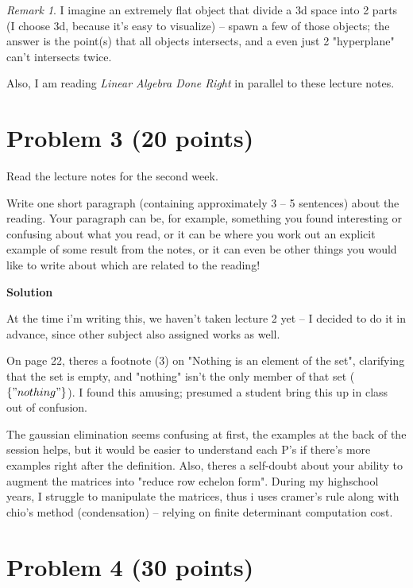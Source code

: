 \documentclass{article}
\newcommand{\solution}{\textbf{\large Solution}}
\theoremstyle{remark}
\newtheorem*{remark}{Remark}
\begin{document}
\begin{remark}
I imagine an extremely flat object that divide a 3d space into 2 parts (I choose 3d, because it's easy to visualize) -- spawn a few of those objects; the answer is the point(s) that all objects intersects, and a even just 2 "hyperplane" can't intersects twice. 
\end{remark}

Also, I am reading \emph{Linear Algebra Done Right} in parallel to these lecture notes.
\newpage

\section*{Problem 3 (20 points)}

Read the lecture notes for the second week.

Write one short paragraph (containing approximately 3 -- 5 sentences) about the reading. Your
paragraph can be, for example, something you found interesting or confusing about what you read,
or it can be where you work out an explicit example of some result from the notes, or it can even
be other things you would like to write about which are related to the reading!

\medskip
\solution


At the time i'm writing this, we haven't taken lecture 2 yet -- I decided to do it in advance, since other subject also assigned works as well. 

On page 22, theres a footnote (3) on "Nothing is an element of the set", clarifying that the set is empty, and "nothing" isn't the only member of that set ($\{"nothing"\}$). I found this amusing; presumed a student bring this up in class out of confusion. 

The gaussian elimination seems confusing at first, the examples at the back of the session helps, but it would be easier to understand each P's if there's more examples right after the definition. 
Also, theres a self-doubt about your ability to augment the matrices into "reduce row echelon form". During my highschool years, I struggle to manipulate the matrices, thus i uses cramer's rule along with chio's method (condensation) -- relying on finite determinant computation cost. 

\newpage

\section*{Problem 4 (30 points)}
\end{document}
